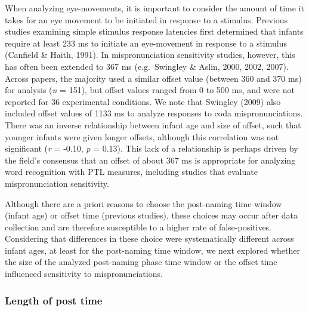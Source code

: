 \documentclass[man]{apa6}
\theoremstyle{definition}
\theoremstyle{definition}
\theoremstyle{definition}
\theoremstyle{remark}
\begin{document}
When analyzing eye-movements, it is important to consider the amount of
time it takes for an eye movement to be initiated in response to a
stimulus. Previous studies examining simple stimulus response latencies
first determined that infants require at least 233 ms to initiate an
eye-movement in response to a stimulus (Canfield \& Haith, 1991). In
mispronunciation sensitivity studies, however, this has often been
extended to 367 ms (e.g.~Swingley \& Aslin, 2000, 2002, 2007). Across
papers, the majority used a similar offset value (between 360 and 370
ms) for analysis (\emph{n} = 151), but offset values ranged from 0 to
500 ms, and were not reported for 36 experimental conditions. We note
that Swingley (2009) also included offset values of 1133 ms to analyze
responses to coda mispronunciations. There was an inverse relationship
between infant age and size of offset, such that younger infants were
given longer offsets, although this correlation was not significant
(\emph{r} = -0.10, \emph{p} = 0.13). This lack of a relationship is
perhaps driven by the field's consensus that an offset of about 367 ms
is appropriate for analyzing word recognition with PTL measures,
including studies that evaluate mispronunciation sensitivity.

Although there are a priori reasons to choose the post-naming time
window (infant age) or offset time (previous studies), these choices may
occur after data collection and are therefore susceptible to a higher
rate of false-positives. Considering that differences in these choice
were systematically different across infant ages, at least for the
post-naming time window, we next explored whether the size of the
analyzed post-naming phase time window or the offset time influenced
sensitivity to mispronunciations.

\subsubsection{Length of post time}\label{length-of-post-time}
\end{document}

